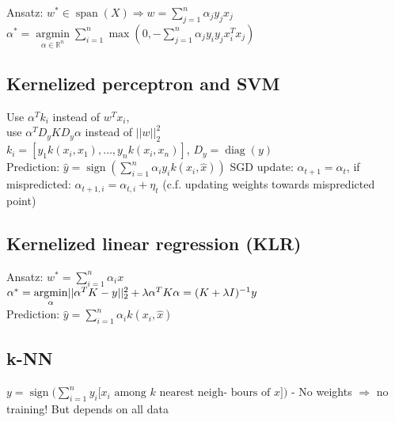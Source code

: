 Ansatz: $w^* \in \operatorname{span}(X) \Rightarrow w = \sum_{j=1}^n \alpha_j y_j x_j$\\
$\alpha^*= \underset{\alpha \in \mathbb{R}^n}{\operatorname{argmin}} \sum_{i=1}^n \operatorname{\max}(0, - \sum_{j=1}^n \alpha_j y_i y_j x_i^T x_j)$

\subsection*{Kernelized perceptron and SVM}
Use $\alpha^T k_i$ instead of $w^T x_i$,\\
use $\alpha^T D_y K D_y \alpha$ instead of $||w||_2^2$\\ 
$k_i=[y_1 k(x_i,x_1), \ldots, y_n k(x_i,x_n)]$, $D_y = \operatorname{diag}(y)$\\
Prediction: $\hat{y} = \operatorname{sign}(\sum_{i=1}^n \alpha_i y_i k(x_i, \hat{x}))$
SGD update: $\alpha_{t+1} = \alpha_t$, if mispredicted: $\alpha_{t+1,i} = \alpha_{t,i} + \eta_t$ (c.f. updating weights towards mispredicted point)

\subsection*{Kernelized linear regression (KLR)}
Ansatz: $w^*=\sum_{i = 1}^n \alpha_i x$\\
$\alpha^*= \underset{\alpha}{\operatorname{argmin}} ||\alpha^T K - y||_2^2 + \lambda \alpha^T K \alpha \\= (K+\lambda I)^{-1} y$\\
Prediction: $\hat{y} = \sum \limits_{i=1}^n \alpha_i k(x_i,\hat{x})$

\subsection*{k-NN}
$y = \operatorname{sign} \big( \sum_{i=1}^n y_i [x_i \text{ among } k \text{ nearest neigh-}$ $\text{bours of } x] \big)$ -
No weights $\Rightarrow$ no training! But depends on all data 